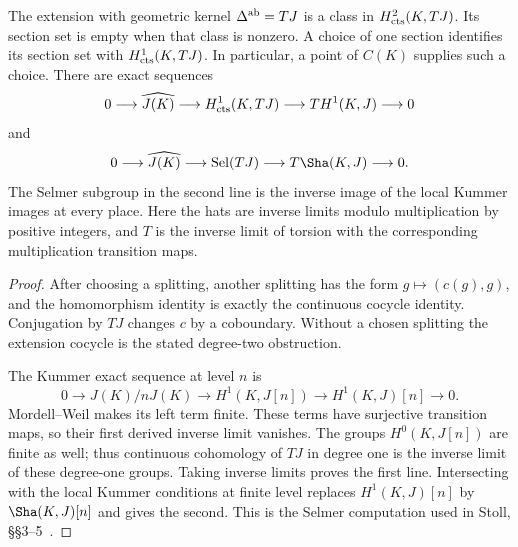 \begin{proposition}
\label{D-abelian}
The extension with geometric kernel $\Delta^{\rm ab}=TJ$
is a class in $H^2_{\rm cts}(K,TJ)$. Its section set is
empty when that class is nonzero. A choice of one
section identifies its section set with
$H^1_{\rm cts}(K,TJ)$. In particular, a point of $C(K)$
supplies such a choice. There are exact sequences
\[
 0\longrightarrow\widehat{J(K)}
 \longrightarrow H^1_{\rm cts}(K,TJ)
 \longrightarrow T H^1(K,J)\longrightarrow0
\]
and
\[
 0\longrightarrow\widehat{J(K)}
 \longrightarrow\operatorname{Sel}(TJ)
 \longrightarrow T\Sha(K,J)\longrightarrow0.
\]
The Selmer subgroup in the second line is the inverse
image of the local Kummer images at every place.
Here the hats are inverse limits modulo multiplication
by positive integers, and $T$ is the inverse limit
of torsion with the corresponding multiplication
transition maps.
\end{proposition}
\begin{proof}
After choosing a splitting, another splitting has
the form $g\mapsto(c(g),g)$, and the homomorphism
identity is exactly the continuous cocycle identity.
Conjugation by $TJ$ changes $c$ by a coboundary.
Without a chosen splitting the extension cocycle is
the stated degree-two obstruction.

The Kummer exact sequence at level $n$ is
\[
 0\longrightarrow J(K)/nJ(K)
 \longrightarrow H^1(K,J[n])
 \longrightarrow H^1(K,J)[n]\longrightarrow0.
\]
Mordell--Weil makes its left term finite. These terms
have surjective transition maps, so their first
derived inverse limit vanishes. The groups
$H^0(K,J[n])$ are finite as well; thus continuous
cohomology of $TJ$ in degree one is the inverse
limit of these degree-one groups. Taking inverse
limits proves the first line. Intersecting with the
local Kummer conditions at finite level replaces
$H^1(K,J)[n]$ by $\Sha(K,J)[n]$ and gives the second.
This is the Selmer computation used in Stoll,
\S\S3--5~\cite{Stoll2007}.
\end{proof}

